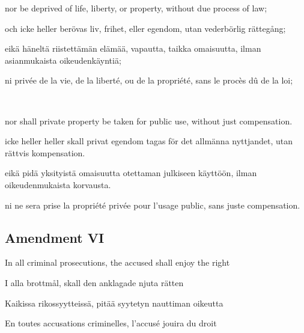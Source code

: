\documentclass[a4,landscape,12pt]{article}
\begin{document}
\begin{minipage}[t]{0.22\textwidth}
nor be deprived of life, liberty, or property, without due process of law;
\end{minipage}\textwidth
\begin{minipage}[t]{0.22\textwidth}
och icke heller berövas liv, frihet, eller egendom, utan vederbörlig rättegång;
\end{minipage}\textwidth
\begin{minipage}[t]{0.22\textwidth}
eikä häneltä riistettämän elämää, vapautta, taikka omaisuutta, ilman asianmukaista oikeudenkäyntiä;
\end{minipage}\textwidth
\begin{minipage}[t]{0.22\textwidth}
ni privée de la vie, de la liberté, ou de la propriété, sans le procès dû de la loi;
\end{minipage}

~

\begin{minipage}[t]{0.22\textwidth}
nor shall private property be taken for public use, without just compensation.
\end{minipage}\textwidth
\begin{minipage}[t]{0.22\textwidth}
icke heller heller skall privat egendom tagas för det allmänna nyttjandet, utan rättvis kompensation.
\end{minipage}\textwidth
\begin{minipage}[t]{0.22\textwidth}
eikä pidä yksityistä omaisuutta otettaman julkiseen käyttöön, ilman oikeudenmukaista korvausta.
\end{minipage}\textwidth
\begin{minipage}[t]{0.22\textwidth}
ni ne sera prise la propriété privée pour l'usage public, sans juste compensation.
\end{minipage}



\subsection*{Amendment VI}
\begin{minipage}[t]{0.22\textwidth}
In all criminal prosecutions, the accused shall enjoy the right
\end{minipage}\textwidth
\begin{minipage}[t]{0.22\textwidth}
I alla brottmål, skall den anklagade njuta rätten
\end{minipage}\textwidth
\begin{minipage}[t]{0.22\textwidth}
Kaikissa rikossyytteissä, pitää syytetyn nauttiman oikeutta
\end{minipage}\textwidth
\begin{minipage}[t]{0.22\textwidth}
En toutes accusations criminelles, l'accusé jouira du droit
\end{minipage}
\end{document}

